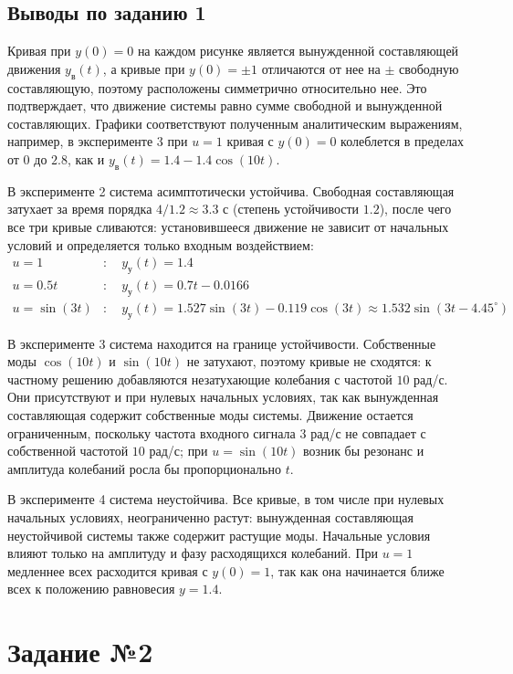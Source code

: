 \documentclass[a4paper, 12pt]{article}
\begin{document}
\subsection{Выводы по заданию 1}
Кривая при $y(0) = 0$ на каждом рисунке является вынужденной составляющей движения $y_{\text{в}}(t)$, а кривые при $y(0) = \pm 1$ отличаются от нее на $\pm$ свободную составляющую, поэтому расположены симметрично относительно нее. Это подтверждает, что движение системы равно сумме свободной и вынужденной составляющих. Графики соответствуют полученным аналитическим выражениям, например, в эксперименте 3 при $u = 1$ кривая с $y(0) = 0$ колеблется в пределах от $0$ до $2.8$, как и $y_{\text{в}}(t) = 1.4 - 1.4\cos{(10t)}$.

В эксперименте 2 система асимптотически устойчива. Свободная составляющая затухает за время порядка $4/1.2 \approx 3.3$ с (степень устойчивости $1.2$), после чего все три кривые сливаются: установившееся движение не зависит от начальных условий и определяется только входным воздействием:
\begin{align*}
    u = 1&: \quad y_{\text{у}}(t) = 1.4 \\
    u = 0.5t&: \quad y_{\text{у}}(t) = 0.7t - 0.0166 \\
    u = \sin{(3t)}&: \quad y_{\text{у}}(t) = 1.527\sin{(3t)} - 0.119\cos{(3t)} \approx 1.532\sin{(3t - 4.45^\circ)}
\end{align*}

В эксперименте 3 система находится на границе устойчивости. Собственные моды $\cos{(10t)}$ и $\sin{(10t)}$ не затухают, поэтому кривые не сходятся: к частному решению добавляются незатухающие колебания с частотой $10$ рад/с. Они присутствуют и при нулевых начальных условиях, так как вынужденная составляющая содержит собственные моды системы. Движение остается ограниченным, поскольку частота входного сигнала $3$ рад/с не совпадает с собственной частотой $10$ рад/с; при $u = \sin{(10t)}$ возник бы резонанс и амплитуда колебаний росла бы пропорционально $t$.

В эксперименте 4 система неустойчива. Все кривые, в том числе при нулевых начальных условиях, неограниченно растут: вынужденная составляющая неустойчивой системы также содержит растущие моды. Начальные условия влияют только на амплитуду и фазу расходящихся колебаний. При $u = 1$ медленнее всех расходится кривая с $y(0) = 1$, так как она начинается ближе всех к положению равновесия $y = 1.4$.
\newpage


\section{Задание №2}
\end{document}
